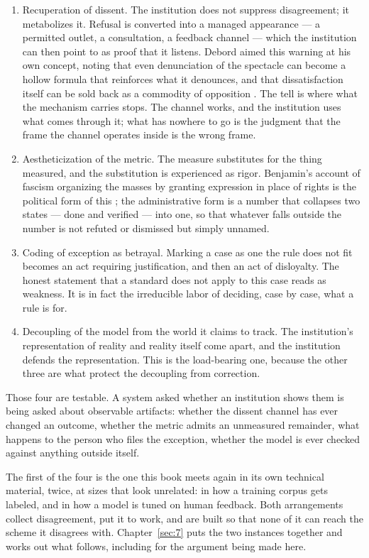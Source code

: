 \begin{enumerate}
  \item Recuperation of dissent. The institution does not suppress disagreement; it metabolizes it. Refusal is converted into a managed appearance — a permitted outlet, a consultation, a feedback channel — which the institution can then point to as proof that it listens. Debord aimed this warning at his own concept, noting that even denunciation of the spectacle can become a hollow formula that reinforces what it denounces, and that dissatisfaction itself can be sold back as a commodity of opposition \autocite{debord1967spectacle}. The tell is where what the mechanism carries stops. The channel works, and the institution uses what comes through it; what has nowhere to go is the judgment that the frame the channel operates inside is the wrong frame.
  \item Aestheticization of the metric. The measure substitutes for the thing measured, and the substitution is experienced as rigor. Benjamin's account of fascism organizing the masses by granting expression in place of rights is the political form of this \autocite{benjamin1935artwork}; the administrative form is a number that collapses two states — done and verified — into one, so that whatever falls outside the number is not refuted or dismissed but simply unnamed.
  \item Coding of exception as betrayal. Marking a case as one the rule does not fit becomes an act requiring justification, and then an act of disloyalty. The honest statement that a standard does not apply to this case reads as weakness. It is in fact the irreducible labor of deciding, case by case, what a rule is for.
  \item Decoupling of the model from the world it claims to track. The institution's representation of reality and reality itself come apart, and the institution defends the representation. This is the load-bearing one, because the other three are what protect the decoupling from correction.
\end{enumerate}
Those four are testable. A system asked whether an institution shows them is being asked about observable artifacts: whether the dissent channel has ever changed an outcome, whether the metric admits an unmeasured remainder, what happens to the person who files the exception, whether the model is ever checked against anything outside itself.

The first of the four is the one this book meets again in its own technical material, twice, at sizes that look unrelated: in how a training corpus gets labeled, and in how a model is tuned on human feedback. Both arrangements collect disagreement, put it to work, and are built so that none of it can reach the scheme it disagrees with. Chapter~\ref{sec:7} puts the two instances together and works out what follows, including for the argument being made here.


